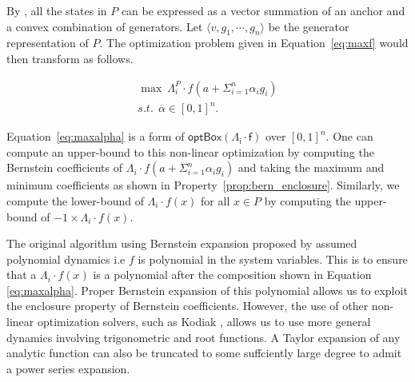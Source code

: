 By , all the states in $P$ can be expressed as a vector summation of an anchor and a convex combination of generators.
%
Let  $\langle v, g_1, \cdots, g_n \rangle$ be the generator representation of $P$.
%
The optimization problem given in Equation~\ref{eq:maxf} would then transform as follows.

\begin{eqnarray}
  \max ~ \Lambda_i^P \cdot f(a + \Sigma_{i=1}^{n} \alpha_i g_i) \label{eq:maxalpha}\\
  s.t. ~~ \overline\alpha \in [0,1]^{n}.\nonumber
\end{eqnarray}

Equation~\ref{eq:maxalpha} is a form of $\mathsf{optBox(\Lambda_{i} \cdot f)}$ over $[0,1]^n$.
%
One can compute an upper-bound to this non-linear optimization by computing the Bernstein coefficients of $\Lambda_i \cdot f(a + \Sigma_{i=1}^{n} \alpha_i g_i)$ and taking the maximum and minimum coefficients as shown in Property~\ref{prop:bern_enclosure}.
%
Similarly, we compute the lower-bound of $\Lambda_{i}\cdot f(x)$ for all $x \in P$ by computing the upper-bound of $-1 \times \Lambda_{i}\cdot f(x)$.
%
\begin{remark}
The original algorithm using Bernstein expansion proposed by \cite{dreossi2016parallelotope} assumed polynomial dynamics i.e $f$ is polynomial in the system variables.
%
This is to ensure that a $\Lambda_{i}\cdot f(x)$ is a polynomial after the composition shown in Equation \ref{eq:maxalpha}. Proper Bernstein expansion of this polynomial allows us to exploit the enclosure property of Bernstein coefficients. However, the use of other non-linear optimization solvers, such as Kodiak \cite{kodiak}, allows us to use more general dynamics involving trigonometric and root functions. A Taylor expansion of any analytic function can also be truncated to some suffciently large degree to admit a power series expansion.
\end{remark}

